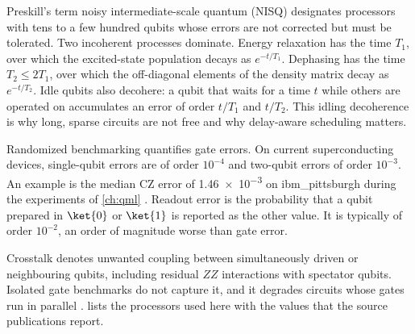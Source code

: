 Preskill's term noisy intermediate-scale quantum (NISQ) \cite{preskill2018nisq} designates processors with tens to a few hundred qubits whose errors are not corrected but must be tolerated. Two incoherent processes dominate. Energy relaxation has the time $T_1$, over which the excited-state population decays as $e^{-t/T_1}$. Dephasing has the time $T_2\le 2T_1$, over which the off-diagonal elements of the density matrix decay as $e^{-t/T_2}$. Idle qubits also decohere: a qubit that waits for a time $t$ while others are operated on accumulates an error of order $t/T_1$ and $t/T_2$. This idling decoherence is why long, sparse circuits are not free and why delay-aware scheduling matters.

Randomized benchmarking \cite{magesan2012rb} quantifies gate errors. On current superconducting devices, single-qubit errors are of order $10^{-4}$ and two-qubit errors of order $10^{-3}$. An example is the median CZ error of \num{1.46e-3} on ibm\_pittsburgh during the experiments of \cref{ch:qml} \cite{guo2025shardq}. Readout error is the probability that a qubit prepared in $\ket{0}$ or $\ket{1}$ is reported as the other value. It is typically of order $10^{-2}$, an order of magnitude worse than gate error.

Crosstalk denotes unwanted coupling between simultaneously driven or neighbouring qubits, including residual $ZZ$ interactions with spectator qubits. Isolated gate benchmarks do not capture it, and it degrades circuits whose gates run in parallel \cite{sheldon2016echoedcr}.  lists the processors used here with the values that the source publications report.


